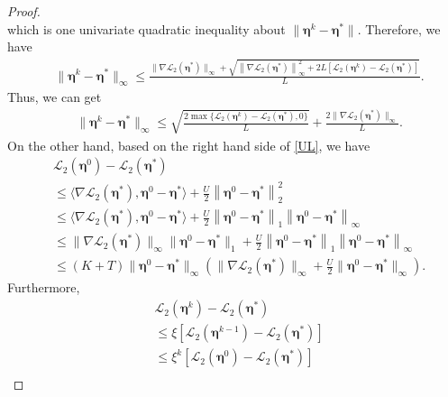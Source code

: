 \documentclass[12pt]{article}
\newcommand{\boldeta}{\boldsymbol{\eta}}
\begin{document}
\begin{appendix}
\begin{proof}
{\begin{equation*}
\end{equation*}
}
which is one univariate quadratic inequality about $\|\boldeta^{k}-\boldeta^{*}\|$.
Therefore, we have
\begin{equation*}
\begin{split}
&\|\boldeta^{k}-\boldeta^{*}\|_{\infty}\leq\frac{\|\nabla \mathcal{L}_2(\boldeta^{*})\|_{\infty}+\sqrt{\left\|\nabla \mathcal{L}_2(\boldeta^{*})\right\|_{\infty}^2+2L[\mathcal{L}_2(\boldeta^{k})-\mathcal{L}_2(\boldeta^{*})]}}{L}.
\end{split}
\end{equation*}
Thus, we can get
\begin{equation}\label{eq002}
\begin{split}
&\|\boldeta^{k}-\boldeta^{*}\|_{\infty}\leq \sqrt{\frac{2\max\{\mathcal{L}_2(\boldeta^{k})-\mathcal{L}_2(\boldeta^{*}),0\}}{L}}+\frac{2\|\nabla \mathcal{L}_2(\boldeta^{*})\|_{\infty}}{L}.
\end{split}
\end{equation}
On the other hand, based on the right hand side of \eqref{UL},
we have
{
\begin{equation*}
\begin{split}
&\mathcal{L}_2(\boldeta^0)-\mathcal{L}_2(\boldeta^*)\\
&\leq\langle\nabla \mathcal{L}_2(\boldeta^*),\boldeta^0-\boldeta^*\rangle+\frac{U}{2}\left\|\boldeta^0-\boldeta^*\right\|_2^2\\
&\leq\langle\nabla \mathcal{L}_2(\boldeta^*),\boldeta^0-\boldeta^*\rangle+\frac{U}{2}\left\|\boldeta^0-\boldeta^*\right\|_1\left\|\boldeta^0-\boldeta^*\right\|_{\infty}\\
&\leq\|\nabla \mathcal{L}_2(\boldeta^*)\|_{\infty}\|\boldeta^0-\boldeta^*\|_1+\frac{U}{2}\left\|\boldeta^0-\boldeta^*\right\|_1\left\|\boldeta^0-\boldeta^*\right\|_{\infty}\\
&\leq (K+T)\|\boldeta^0-\boldeta^*\|_{\infty}(\|\nabla \mathcal{L}_2(\boldeta^*)\|_{\infty}+\frac{U}{2}\|\boldeta^0-\boldeta^*\|_{\infty}).
\end{split}
\end{equation*}
}
Furthermore,
{
\begin{equation*}
\begin{split}
&\mathcal{L}_2(\boldeta^{k})-\mathcal{L}_2(\boldeta^{*})\\
&\leq \xi[\mathcal{L}_2(\boldeta^{k-1})-\mathcal{L}_2(\boldeta^{*})]\\
&\leq \xi^{k}[\mathcal{L}_2(\boldeta^{0})-\mathcal{L}_2(\boldeta^{*})]\\

\end{split}
\end{equation*}}
\end{proof}
\end{appendix}
\end{document}
